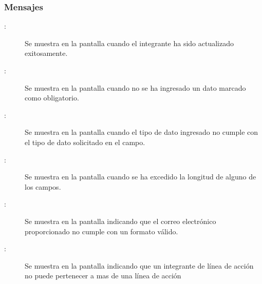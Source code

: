 \subsubsection{Mensajes}
    \begin{description}
      \item[:] Se muestra en la pantalla  cuando el integrante ha sido actualizado exitosamente.
      \item[:] Se muestra en la pantalla  cuando no se ha ingresado un dato marcado como obligatorio.
      \item[:] Se muestra en la pantalla  cuando el tipo de dato ingresado no cumple con el tipo de dato solicitado en el campo.
      \item[:] Se muestra en la pantalla  cuando se ha excedido la longitud de alguno de los campos.
      \item[:] Se muestra en la pantalla  indicando que el correo electrónico proporcionado no cumple con un formato válido. 
      \item[:] Se muestra en la pantalla  indicando que un integrante de línea de acción no puede pertenecer a mas de una línea de acción
    \end{description}
